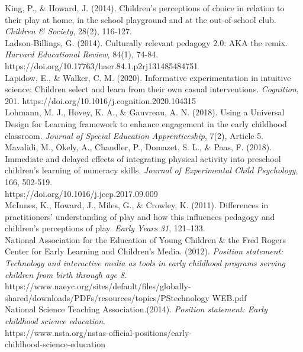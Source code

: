\documentclass[11.5pt]{sig-alternate}
\begin{document}
King, P., \& Howard, J. (2014). Children’s perceptions of choice in relation to their play at home, 
in the school playground and at the out-of-school club. \textit{Children \& Society}, 28(2), 116-127.
\\

Ladson-Billings, G. (2014). Culturally relevant pedagogy 2.0: AKA the remix. \textit{Harvard 
Educational Review}, 84(1), 74-84. \\https://doi.org/10.17763/haer.84.1.p2rj131485484751 
\\

Lapidow, E., \& Walker, C. M. (2020). Informative experimentation in intuitive science: 
Children select and learn from their own casual interventions. \textit{Cognition}, 201. https://doi.org/10.1016/j.cognition.2020.104315 
\\

Lohmann, M. J., Hovey, K. A., \& Gauvreau, A. N. (2018). Using a Universal Design for 
Learning framework to enhance engagement in the early childhood classroom. \textit{Journal of Special Education Apprenticeship}, 7(2), Article 5.
\\

Mavalidi, M., Okely, A., Chandler, P., Domazet, S. L., \& Paas, F. (2018). Immediate and 
delayed effects of integrating physical activity into preschool children’s learning of numeracy skills. \textit{Journal of Experimental Child Psychology}, 166, 502-519. \\https://doi.org/10.1016/j.jecp.2017.09.009 
\\

McInnes, K., Howard, J., Miles, G., \& Crowley, K. (2011). Differences in practitioners’ 
understanding of play and how this influences pedagogy and children’s perceptions of play. \textit{Early Years 31}, 121–133.
\\

National Association for the Education of Young Children \& the Fred Rogers Center for Early 
Learning and Children’s Media. (2012). \textit{Position statement: Technology and interactive media as tools in early childhood programs serving children from birth through age 8. }\\
https://www.naeyc.org/sites/default/files/globally-\\shared/downloads/PDFs/resources/topics/PS\textunderscore technology \textunderscore WEB.pdf
\\
\newpage
National Science Teaching Association.(2014).\textit{ Position statement: Early childhood science education}. \\https://www.nsta.org/nstas-official-positions/early-\\childhood-science-education
\\
\end{document}
